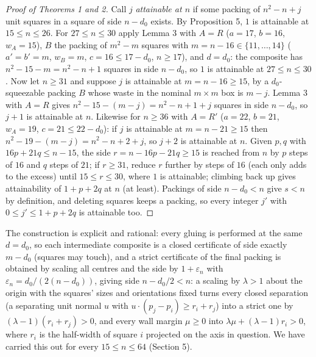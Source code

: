 \documentclass[11pt,letterpaper]{amsart}
\theoremstyle{plain}
\begin{document}
\begin{proof}[Proof of Theorems 1 and 2]
Call $j$ \emph{attainable at $n$} if some packing of $n^2 - n + j$ unit squares in a square of side $n - d_0$ exists. By Proposition 5, $1$ is attainable at $15 \le n \le 26$. For $27 \le n \le 30$ apply Lemma 3 with $A = R$ ($a = 17$, $b = 16$, $w_A = 15$), $B$ the packing of $m^2 - m$ squares with $m = n - 16 \in \{11, \ldots, 14\}$ ($a' = b' = m$, $w_B = m$, $c = 16 \le 17 - d_0$, $n \ge 17$), and $d = d_0$: the composite has $n^2 - 15 - m = n^2 - n + 1$ squares in side $n - d_0$, so $1$ is attainable at $27 \le n \le 30$. Now let $n \ge 31$ and suppose $j$ is attainable at $m = n - 16 \ge 15$, by a $d_0$-squeezable packing $B$ whose waste in the nominal $m \times m$ box is $m - j$. Lemma 3 with $A = R$ gives $n^2 - 15 - (m - j) = n^2 - n + 1 + j$ squares in side $n - d_0$, so $j + 1$ is attainable at $n$. Likewise for $n \ge 36$ with $A = R'$ ($a = 22$, $b = 21$, $w_A = 19$, $c = 21 \le 22 - d_0$): if $j$ is attainable at $m = n - 21 \ge 15$ then $n^2 - 19 - (m - j) = n^2 - n + 2 + j$, so $j + 2$ is attainable at $n$. Given $p, q$ with $16p + 21q \le n - 15$, the side $r = n - 16p - 21q \ge 15$ is reached from $n$ by $p$ steps of $16$ and $q$ steps of $21$; if $r \ge 31$, reduce $r$ further by steps of $16$ (each only adds to the excess) until $15 \le r \le 30$, where $1$ is attainable; climbing back up gives attainability of $1 + p + 2q$ at $n$ (at least). Packings of side $n - d_0 < n$ give $s < n$ by definition, and deleting squares keeps a packing, so every integer $j'$ with $0 \le j' \le 1 + p + 2q$ is attainable too.
\end{proof}

The construction is explicit and rational: every gluing is performed at the same $d = d_0$, so each intermediate composite is a closed certificate of side exactly $m - d_0$ (squares may touch), and a strict certificate of the final packing is obtained by scaling all centres and the side by $1 + \varepsilon_n$ with $\varepsilon_n = d_0/(2(n - d_0))$, giving side $n - d_0/2 < n$: a scaling by $\lambda > 1$ about the origin with the squares' sizes and orientations fixed turns every closed separation (a separating unit normal $u$ with $u\cdot(p_j - p_i) \ge r_i + r_j$) into a strict one by $(\lambda - 1)(r_i + r_j) > 0$, and every wall margin $\mu \ge 0$ into $\lambda\mu + (\lambda - 1) r_i > 0$, where $r_i$ is the half-width of square $i$ projected on the axis in question. We have carried this out for every $15 \le n \le 64$ (Section 5).
\end{document}
